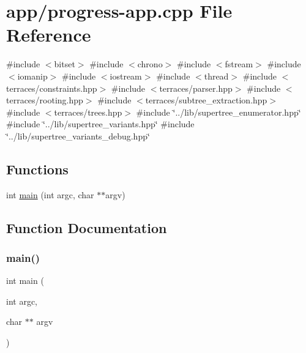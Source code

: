 \hypertarget{progress-app_8cpp}{}\section{app/progress-\/app.cpp File Reference}
\label{progress-app_8cpp}
{\ttfamily \#include $<$bitset$>$}\newline
{\ttfamily \#include $<$chrono$>$}\newline
{\ttfamily \#include $<$fstream$>$}\newline
{\ttfamily \#include $<$iomanip$>$}\newline
{\ttfamily \#include $<$iostream$>$}\newline
{\ttfamily \#include $<$thread$>$}\newline
{\ttfamily \#include $<$terraces/constraints.\+hpp$>$}\newline
{\ttfamily \#include $<$terraces/parser.\+hpp$>$}\newline
{\ttfamily \#include $<$terraces/rooting.\+hpp$>$}\newline
{\ttfamily \#include $<$terraces/subtree\+\_\+extraction.\+hpp$>$}\newline
{\ttfamily \#include $<$terraces/trees.\+hpp$>$}\newline
{\ttfamily \#include \char`\"{}../lib/supertree\+\_\+enumerator.\+hpp\char`\"{}}\newline
{\ttfamily \#include \char`\"{}../lib/supertree\+\_\+variants.\+hpp\char`\"{}}\newline
{\ttfamily \#include \char`\"{}../lib/supertree\+\_\+variants\+\_\+debug.\+hpp\char`\"{}}\newline
\subsection*{Functions}
\begin{DoxyCompactItemize}
\item 
int \hyperlink{progress-app_8cpp_a3c04138a5bfe5d72780bb7e82a18e627}{main} (int argc, char $\ast$$\ast$argv)
\end{DoxyCompactItemize}


\subsection{Function Documentation}
\mbox{\label{progress-app_8cpp_a3c04138a5bfe5d72780bb7e82a18e627}} 
\subsubsection{\texorpdfstring{main()}{main()}}
{\footnotesize\ttfamily int main (\begin{DoxyParamCaption}\item[{int}]{argc,  }\item[{char $\ast$$\ast$}]{argv }\end{DoxyParamCaption})}

